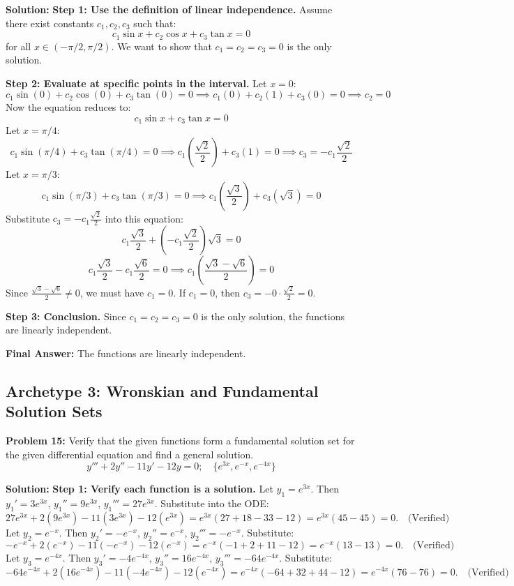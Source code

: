 \documentclass[11pt,letterpaper]{article}
\begin{document}
\textbf{Solution:}
\textbf{Step 1: Use the definition of linear independence.}
Assume there exist constants $c_1, c_2, c_3$ such that:
\[ c_1 \sin x + c_2 \cos x + c_3 \tan x = 0 \]
for all $x \in (-\pi/2, \pi/2)$. We want to show that $c_1 = c_2 = c_3 = 0$ is the only solution.

\textbf{Step 2: Evaluate at specific points in the interval.}
Let $x = 0$:
\[ c_1 \sin(0) + c_2 \cos(0) + c_3 \tan(0) = 0 \implies c_1(0) + c_2(1) + c_3(0) = 0 \implies c_2 = 0 \]
Now the equation reduces to:
\[ c_1 \sin x + c_3 \tan x = 0 \]
Let $x = \pi/4$:
\[ c_1 \sin(\pi/4) + c_3 \tan(\pi/4) = 0 \implies c_1 \left(\frac{\sqrt{2}}{2}\right) + c_3 (1) = 0 \implies c_3 = -c_1 \frac{\sqrt{2}}{2} \]
Let $x = \pi/3$:
\[ c_1 \sin(\pi/3) + c_3 \tan(\pi/3) = 0 \implies c_1 \left(\frac{\sqrt{3}}{2}\right) + c_3 (\sqrt{3}) = 0 \]
Substitute $c_3 = -c_1 \frac{\sqrt{2}}{2}$ into this equation:
\[ c_1 \frac{\sqrt{3}}{2} + \left(-c_1 \frac{\sqrt{2}}{2}\right) \sqrt{3} = 0 \]
\[ c_1 \frac{\sqrt{3}}{2} - c_1 \frac{\sqrt{6}}{2} = 0 \implies c_1 \left( \frac{\sqrt{3} - \sqrt{6}}{2} \right) = 0 \]
Since $\frac{\sqrt{3} - \sqrt{6}}{2} \neq 0$, we must have $c_1 = 0$.
If $c_1 = 0$, then $c_3 = -0 \cdot \frac{\sqrt{2}}{2} = 0$.

\textbf{Step 3: Conclusion.}
Since $c_1 = c_2 = c_3 = 0$ is the only solution, the functions are linearly independent.

\textbf{Final Answer:} The functions are linearly independent.

\subsection{Archetype 3: Wronskian and Fundamental Solution Sets}

\textbf{Problem 15:} Verify that the given functions form a fundamental solution set for the given differential equation and find a general solution.
\[ y''' + 2y'' - 11y' - 12y = 0; \quad \{e^{3x}, e^{-x}, e^{-4x}\} \]

\textbf{Solution:}
\textbf{Step 1: Verify each function is a solution.}
Let $y_1 = e^{3x}$. Then $y_1' = 3e^{3x}$, $y_1'' = 9e^{3x}$, $y_1''' = 27e^{3x}$.
Substitute into the ODE:
\[ 27e^{3x} + 2(9e^{3x}) - 11(3e^{3x}) - 12(e^{3x}) = e^{3x}(27 + 18 - 33 - 12) = e^{3x}(45 - 45) = 0. \quad \text{(Verified)} \]
Let $y_2 = e^{-x}$. Then $y_2' = -e^{-x}$, $y_2'' = e^{-x}$, $y_2''' = -e^{-x}$.
Substitute:
\[ -e^{-x} + 2(e^{-x}) - 11(-e^{-x}) - 12(e^{-x}) = e^{-x}(-1 + 2 + 11 - 12) = e^{-x}(13 - 13) = 0. \quad \text{(Verified)} \]
Let $y_3 = e^{-4x}$. Then $y_3' = -4e^{-4x}$, $y_3'' = 16e^{-4x}$, $y_3''' = -64e^{-4x}$.
Substitute:
\[ -64e^{-4x} + 2(16e^{-4x}) - 11(-4e^{-4x}) - 12(e^{-4x}) = e^{-4x}(-64 + 32 + 44 - 12) = e^{-4x}(76 - 76) = 0. \quad \text{(Verified)} \]
\end{document}
